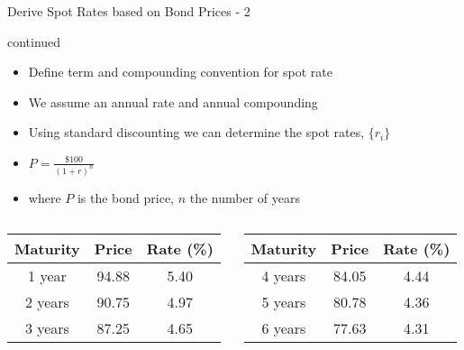 \documentclass[handout, aspectratio=169]{beamer}
\begin{document}
\begin{frame}{Derive Spot Rates based on Bond Prices - 2}
	\begin{example}
		\scriptsize
		continued
		\begin{itemize}
			\item Define term and compounding convention for spot rate
			\item We assume an annual rate and annual compounding
			\item Using standard discounting we can determine the spot rates, $\{r_i\}$
			\item $P = \frac{\$100}{(1 + r)^n}$ 
			\item where $P$ is the bond price, $n$ the number of years
		\end{itemize} 
		\begin{columns}
			\begin{column}{0.5\textwidth}
				\begin{table}[h]
					\begin{tabular}{|c|c|c|} 
						\hline
						\textbf{Maturity} & \textbf{Price} & \textbf{Rate (\%)}\\				
						\hline
						1 year & 94.88 & 5.40 \\
						2 years & 90.75 & 4.97 \\
						3 years & 87.25 & 4.65 \\
						\hline
					\end{tabular}
				\end{table}
			\end{column}
			\begin{column}{0.5\textwidth}
				\begin{table}[h]
					\begin{tabular}{|c|c|c|} 
						\hline
						\textbf{Maturity} & \textbf{Price} & \textbf{Rate (\%)}\\				
						\hline
						4 years & 84.05 & 4.44 \\
						5 years & 80.78 & 4.36 \\
						6 years & 77.63 & 4.31 \\
						\hline
					\end{tabular}
				\end{table}
			\end{column}
		\end{columns}
	\end{example}
\end{frame}
\end{document}
